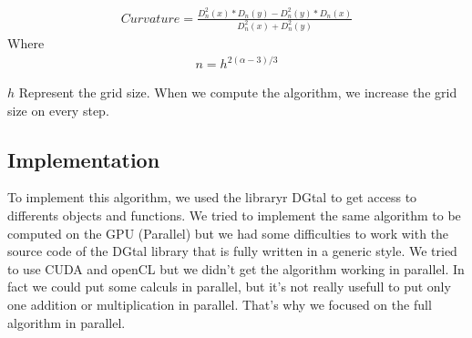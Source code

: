 \begin{align*}
	Curvature =  \frac{ D_{n}^2(x) * D_{n}(y)  -  D_{n}^2(y) * D_{n}(x) }{D_{n}^2(x) + D_{n}^2(y)}
 \end{align*}
Where
  \begin{align*}
	n = h^{2(\alpha - 3)/3}
  \end{align*}

$ h $ Represent the grid size. When we compute the algorithm, we increase the grid size on every step.

\subsection{Implementation}
To implement this algorithm, we used the libraryr DGtal to get access to differents objects and functions. We tried to implement the same algorithm to be computed on the GPU (Parallel) but we had some difficulties to work with the source code of the DGtal library that is fully written in a generic style. We tried to use CUDA and openCL but we didn't get the algorithm working in parallel. In fact we could put some calculs in parallel, but it's not really usefull to put only one addition or multiplication in parallel. That's why we focused on the full algorithm in parallel.
